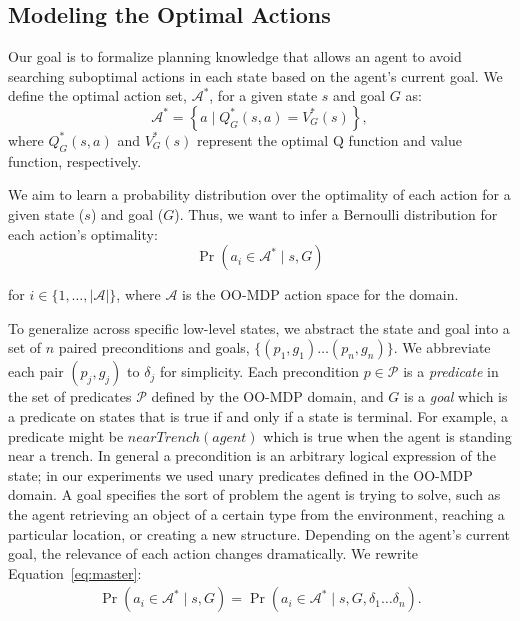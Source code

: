 \documentclass[letterpaper]{article}
\begin{document}
\subsection{Modeling the Optimal Actions}

Our goal is to formalize planning knowledge that allows an agent to
avoid searching suboptimal actions in each state based on the agent's
current goal. We define the optimal action set, $\mathcal{A}^*$, for a
given state $s$ and goal $G$ as:
\begin{equation}
\mathcal{A}^* = \left\{ a \mid Q^*_G(s,a) = V^*_G(s) \right\}, 
\label{eq:opt_act_set}
\end{equation}
where $Q^*_G(s,a)$ and $V^*_G(s)$ represent the optimal Q function and 
value function, respectively.

We aim to learn a probability distribution over the optimality of each action
for a given state ($s$) and goal ($G$). Thus, we want to infer a Bernoulli
distribution for each action's optimality:
\begin{equation}
\Pr(a_i \in \mathcal{A}^* \mid s, G)
\label{eq:master}
\end{equation}

\noindent for $i \in \{1, \ldots, |\mathcal{A}|\}$, where
$\mathcal{A}$ is the OO-MDP action space for the domain.

To generalize across specific low-level states, we abstract the state
and goal into a set of $n$ paired preconditions and goals, $\{
(p_1, g_1) \ldots (p_{n}, g_{n}) \}$. We abbreviate each pair $(p_j,
g_j)$ to $\delta_j$ for simplicity. Each precondition $p \in
\mathcal{P}$ is a {\it predicate} in the set of predicates $\mathcal{P}$
defined by the OO-MDP domain, and $G$ is a {\it goal} which is a
predicate on states that is true if and only if a state is terminal. For example, a
predicate might be $nearTrench(agent)$ which is true when the agent is
standing near a trench.  In general a precondition is an arbitrary
logical expression of the state; in our experiments we used unary
predicates defined in the OO-MDP domain. A goal specifies the
sort of problem the agent is trying to solve, such as the agent
retrieving an object of a certain type from the environment, reaching
a particular location, or creating a new structure.  Depending on the
agent's current goal, the relevance of each action changes
dramatically.  We rewrite Equation~\ref{eq:master}:
\begin{multline}
\Pr(a_i \in \mathcal{A}^* \mid s, G)
= \Pr(a_i \in \mathcal{A}^* \mid s, G, \delta_1 \ldots \delta_n).
\end{multline}
\end{document}
